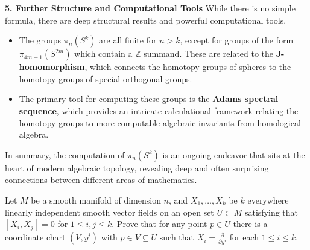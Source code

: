 \begin{remark}
\textbf{5. Further Structure and Computational Tools}
While there is no simple formula, there are deep structural results and powerful computational tools.
\begin{itemize}
    \item The groups $\pi_n(S^k)$ are all finite for $n>k$, except for groups of the form $\pi_{4m-1}(S^{2m})$ which contain a $\mathbb{Z}$ summand. These are related to the \textbf{J-homomorphism}, which connects the homotopy groups of spheres to the homotopy groups of special orthogonal groups.
    \item The primary tool for computing these groups is the \textbf{Adams spectral sequence}, which provides an intricate calculational framework relating the homotopy groups to more computable algebraic invariants from homological algebra.
\end{itemize}
In summary, the computation of $\pi_n(S^k)$ is an ongoing endeavor that sits at the heart of modern algebraic topology, revealing deep and often surprising connections between different areas of mathematics.
\end{remark}

\clearpage

\begin{exercise}
\label{geometry:2012:2}
Let $M$ be a smooth manifold of dimension $n$, and $X_{1}, \ldots, X_{k}$ be $k$ everywhere linearly independent smooth vector fields on an open set $U \subset M$ satisfying that $[X_{i}, X_{j}] = 0$ for $1 \leq i, j \leq k$. Prove that for any point $p \in U$ there is a coordinate chart $(V, y^{i})$ with $p \in V \subseteq U$ such that $X_{i} = \frac{\partial}{\partial y^{i}}$ for each $1 \leq i \leq k$.
\end{exercise}

